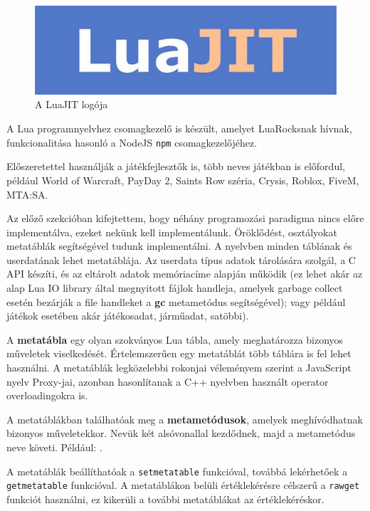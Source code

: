 \begin{figure}[h]
\centering
\includegraphics[scale=0.15]{images/luajit-logo.jpg}
\caption{A LuaJIT logója}
\end{figure}

A Lua programnyelvhez csomagkezelő is készült, amelyet LuaRocksnak hívnak, funkcionalitása hasonló a NodeJS \texttt{npm} csomagkezelőjéhez.

Előszeretettel használják a játékfejlesztők is, több neves játékban is előfordul, például World of Warcraft, PayDay 2, Saints Row széria, Crysis, Roblox, FiveM, MTA:SA. \cite{usageoflua}

\pagebreak

Az előző szekcióban kifejtettem, hogy néhány programozási paradigma nincs előre implementálva, ezeket nekünk kell implementálunk. Öröklődést, osztályokat metatáblák segítségével tudunk implementálni.
A nyelvben minden táblának és userdatának lehet metatáblája. Az userdata típus adatok tárolására szolgál, a C API készíti, és az eltárolt adatok memóriacíme alapján működik (ez lehet akár az alap Lua IO library által megnyitott fájlok handleja, amelyek garbage collect esetén bezárják a file handleket a \detokenize{__}\textbf{gc} metametódus segítségével); vagy például játékok esetében akár játékosadat, járműadat, satöbbi).

A \textbf{metatábla} egy olyan szokványos Lua tábla, amely meghatározza bizonyos műveletek viselkedését. Értelemszerűen egy metatáblát több táblára is fel lehet használni. A metatáblák legközelebbi rokonjai véleményem szerint a JavaScript nyelv Proxy-jai, azonban hasonlítanak a C++ nyelvben használt operator overloadingokra is. 

A metatáblákban találhatóak meg a \textbf{metametódusok}, amelyek meghívódhatnak bizonyos műveletekkor. Nevük két alsóvonallal kezdődnek, majd a metametódus neve követi. Például: \texttt{}.

A metatáblák beállíthatóak a \texttt{setmetatable} funkcióval, továbbá lekérhetőek a \texttt{getmetatable} funkcióval. A metatáblákon belüli értéklekérésre célszerű a \texttt{rawget} funkciót használni, ez kikerüli a további metatáblákat az értéklekéréskor.

